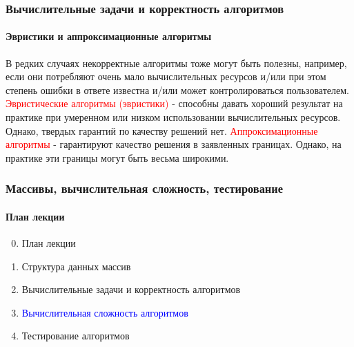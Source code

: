 \documentclass[aspectratio=169]{beamer}
\begin{document}
\begin{frame}
\frametitle{Вычислительные задачи и корректность алгоритмов}
\framesubtitle{Эвристики и аппроксимационные алгоритмы}
\justifying
\small
В редких случаях некорректные алгоритмы тоже могут быть полезны, например, если они потребляют очень мало вычислительных ресурсов и/или при этом степень ошибки в ответе известна и/или может контролироваться пользователем.\newline\newline
\textcolor{red}{Эвристические алгоритмы (эвристики)} - способны давать хороший результат на практике при умеренном или низком использовании вычислительных ресурсов. Однако, твердых гарантий по качеству решений нет.\newline\newline
\textcolor{red}{Аппроксимационные алгоритмы} - гарантируют качество решения в заявленных границах. Однако, на практике эти границы могут быть весьма широкими.

\end{frame}

\begin{frame}
\frametitle{Массивы, вычислительная сложность, тестирование}
\framesubtitle{План лекции}

\begin{enumerate}
  \setcounter{enumi}{-1}
  \item{План лекции}
  \item{Структура данных массив}
  \item{Вычислительные задачи и корректность алгоритмов}
  \item{\textcolor{blue}{Вычислительная сложность алгоритмов}}
  \item{Тестирование алгоритмов}
\end{enumerate}
\end{frame}
\end{document}
